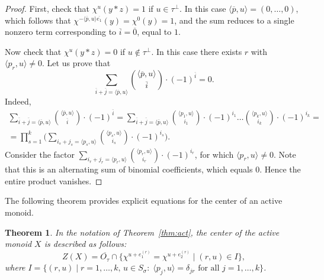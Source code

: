 \documentclass[a4paper, 11pt]{amsart}
\theoremstyle{plain}
\newtheorem{theorem}{Theorem}[section]
\theoremstyle{remark}
\theoremstyle{definition}
\newcommand{\ol}[1]{\overline{#1}}
\begin{document}
\begin{proof}
First, check that $\chi^u (y * z)  = 1$ if $u \in \tau^\perp$. In this case $\langle \ol{p}, u \rangle = (0, \ldots, 0)$, which follows that $\chi^{-\langle \ol{p}, u \rangle\ol{e_1} }(y) = \chi^0(y) = 1$, and the sum reduces to a single nonzero term corresponding to $\ol{i} = \ol{0}$, equal to $1$.  

Now check that $\chi^u (y * z)  = 0$ if $u \notin \tau^\perp$. In this case there exists $r$ with $\langle p_r, u \rangle \neq 0$. Let us prove that
\begin{equation}
	\sum \limits_{\ol{i} + \ol{j} = \langle \ol{p}, u \rangle } { \langle \ol{p}, u \rangle \choose \ol{i} } \cdot  (-1)^{\ol{i}} = 0.
\end{equation}
Indeed,
\begin{gather*}
\sum \limits_{\ol{i} + \ol{j} = \langle \ol{p}, u \rangle } { \langle \ol{p}, u \rangle \choose \ol{i} } \cdot  (-1)^{\ol{i}} = \sum \limits_{\ol{i} + \ol{j} = \langle \ol{p}, u \rangle } { \langle p_1, u \rangle \choose i_1 } \cdot  (-1)^{i_1} \ldots { \langle p_k, u \rangle \choose i_k } \cdot  (-1)^{i_k} =\\= \prod \limits_{s = 1}^{k} \biggl(\sum \limits_{i_s + j_s = \langle p_s, u \rangle } { \langle p_s, u \rangle \choose i_s } \cdot  (-1)^{i_s}\biggr).
\end{gather*}
Consider the factor $\sum \limits_{i_r + j_r = \langle p_r, u \rangle} {\langle p_r, u \rangle \choose i_r} \cdot (-1)^{i_r}$, for which $\langle p_r, u \rangle \neq 0$. Note that this is an alternating sum of binomial coefficients, which equals $0$. Hence the entire product vanishes.
\end{proof}

The following theorem provides explicit equations for the center of an active monoid.

\begin{theorem} \label{thm:z}
In the notation of Theorem~\ref{thm:act}, the center of the active monoid $X$ is described as follows:
$$Z(X) = \ol{O_\tau} \cap \{\chi^{u + e_1^{(r)}} =  \chi^{u + e_2^{(r)}} \mid (r,u) \in I\},$$ 
where $I = \{(r,u) \mid r = 1, \ldots, k, \, u \in S_\sigma: \; \langle p_j, u \rangle = \delta_{jr} \text{ for all } j = 1, \ldots, k\}$.
\end{theorem}
\end{document}
